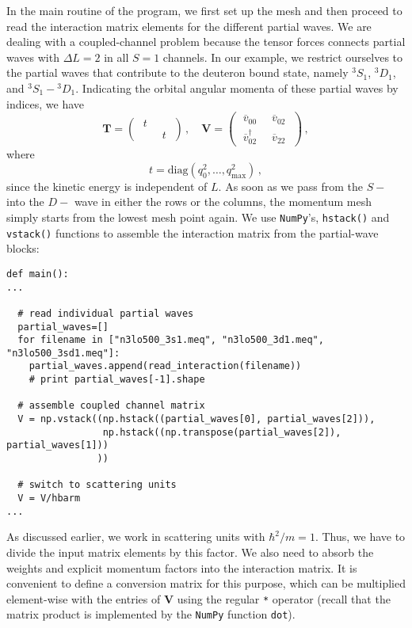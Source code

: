In the main routine of the program, we first set up the mesh and 
then proceed to read the interaction matrix elements for the 
different partial waves.
We are dealing with a coupled-channel problem because
the tensor forces connects partial waves with $\Delta L=2$
in all $S=1$ channels. In our example, we restrict ourselves
to the partial waves that contribute to the deuteron bound
state, namely ${}^3S_1$, ${}^3D_1$,
and ${}^3S_1-{}^3D_1$. Indicating the orbital angular momenta
of these partial waves by indices, we have
\begin{equation}
  \mathbf{T}=
  \begin{pmatrix} 
      \;t\; &   \\
        &  \;t\;
  \end{pmatrix}\,,
  \quad
  \mathbf{V}=
  \begin{pmatrix} 
      \;\overline{v}_{00}\;       &  \;\overline{v}_{02}\; \\
      \;\overline{v}^\dag_{02}\;  &  \;\overline{v}_{22}\;
  \end{pmatrix}\,,
\end{equation}
where 
\begin{equation}
  t = \mathrm{diag}\left(q_0^2,\ldots,q_\text{max}^2\right)\,,
\end{equation}
since the kinetic energy is independent of $L$. As soon as we pass 
from the $S-$ into the $D-$ wave in either the
rows or the columns, the momentum mesh simply starts from the
lowest mesh point again. We use \texttt{NumPy}'s, \texttt{hstack()} 
and \texttt{vstack()} functions to assemble the interaction matrix
from the partial-wave blocks:

\begin{lstlisting}
def main():
...
  
  # read individual partial waves
  partial_waves=[]
  for filename in ["n3lo500_3s1.meq", "n3lo500_3d1.meq", "n3lo500_3sd1.meq"]:
    partial_waves.append(read_interaction(filename))
    # print partial_waves[-1].shape

  # assemble coupled channel matrix
  V = np.vstack((np.hstack((partial_waves[0], partial_waves[2])), 
                 np.hstack((np.transpose(partial_waves[2]), partial_waves[1]))
                ))

  # switch to scattering units
  V = V/hbarm
...
\end{lstlisting}

As discussed earlier, we work in scattering units with $\hbar^2/m=1$. Thus,
we have to divide the input matrix elements by this factor. We also need to
absorb the weights and explicit momentum factors into the interaction matrix.
It is convenient to define a conversion matrix for this purpose, which can
be multiplied element-wise with the entries of $\mathbf{V}$ using the 
regular \texttt{*} operator (recall that the matrix product is implemented
by the \texttt{NumPy} function \texttt{dot}).

